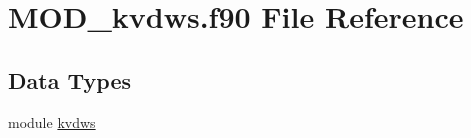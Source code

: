 \hypertarget{MOD__kvdws_8f90}{\section{M\-O\-D\-\_\-kvdws.\-f90 File Reference}
\label{MOD__kvdws_8f90}
}
\subsection*{Data Types}
\begin{DoxyCompactItemize}
\item 
module \hyperlink{classkvdws}{kvdws}
\end{DoxyCompactItemize}
